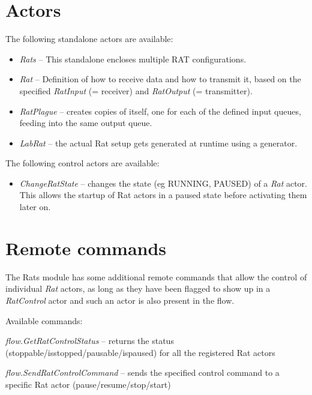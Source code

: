 \documentclass[a4paper]{book}
\begin{document}
\section{Actors}
The following standalone actors are available:
\begin{itemize}
	\item \textit{Rats} -- This standalone encloses multiple RAT configurations.
	\item \textit{Rat} -- Definition of how to receive data and how to transmit 
	it, based on the specified \textit{RatInput} (= receiver) and 
	\textit{RatOutput} (= transmitter).
	\item \textit{RatPlague} -- creates copies of itself, one for each of
	the defined input queues, feeding into the same output queue.
	\item \textit{LabRat} -- the actual Rat setup gets generated at runtime
	using a generator.
\end{itemize}
The following control actors are available:
\begin{itemize}
	\item \textit{ChangeRatState} -- changes the state (eg RUNNING, PAUSED)
	of a \textit{Rat} actor. This allows the startup of Rat actors in a
	paused state before activating them later on.
\end{itemize}


\section{Remote commands}
The Rats module has some additional remote commands that allow the control of
individual \textit{Rat} actors, as long as they have been flagged to show up in a
\textit{RatControl} actor and such an actor is also present in the flow.

Available commands:
\begin{tight_itemize}
  \item \textit{flow.GetRatControlStatus} -- returns the status
  (stoppable/isstopped/pausable/ispaused) for all the registered Rat actors
  \item \textit{flow.SendRatControlCommand} -- sends the specified control command
  to a specific Rat actor (pause/resume/stop/start)
\end{tight_itemize}

\end{document}

